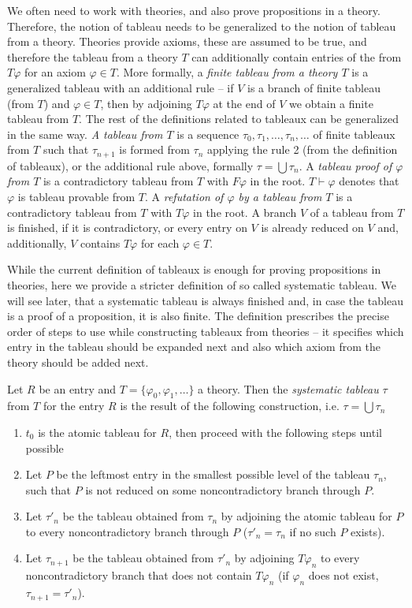 We often need to work with theories, and also prove propositions in a theory. Therefore, the notion of tableau needs to be generalized to the notion of tableau from a theory. Theories provide axioms, these are assumed to be true, and therefore the tableau from a theory $T$ can additionally contain entries of the from $T \varphi$ for an axiom $\varphi \in T$. More formally, a \emph{finite tableau from a theory $T$} is a generalized tableau with an additional rule -- if $V$ is a branch of finite tableau (from $T$) and $\varphi \in T$, then by adjoining $T \varphi$ at the end of $V$ we obtain a finite tableau from $T$. The rest of the definitions related to tableaux can be generalized in the same way. \emph{A tableau from $T$} is a sequence $\tau_0, \tau_1, \dots, \tau_n, \dots$ of finite tableaux from $T$ such that $\tau_{n+1}$ is formed from $\tau_n$ applying the rule 2 (from the definition of tableaux), or the additional rule above, formally $\tau = \bigcup \tau_n$. A \emph{tableau proof of $\varphi$ from $T$} is a contradictory tableau from $T$ with $F \varphi$ in the root. $T \vdash \varphi$ denotes that $\varphi$ is tableau provable from $T$. A \emph{refutation of $\varphi$ by a tableau from $T$} is a contradictory tableau from $T$ with $T \varphi$ in the root. A branch $V$ of a tableau from $T$ is finished, if it is contradictory, or every entry on $V$ is already reduced on $V$ and, additionally, $V$ contains $T \varphi$ for each $\varphi \in T$.

While the current definition of tableaux is enough for proving propositions in theories, here we provide a stricter definition of so called systematic tableau. We will see later, that a systematic tableau is always finished and, in case the tableau is a proof of a proposition, it is also finite. The definition prescribes the precise order of steps to use while constructing tableaux from theories -- it specifies which entry in the tableau should be expanded next and also which axiom from the theory should be added next.

\begin{definition}
Let $R$ be an entry and $T = \{\varphi_0, \varphi_1, \dots\}$ a theory. Then the \emph{systematic tableau} $\tau$ from $T$ for the entry $R$ is the result of the following construction, i.e. $\tau = \bigcup \tau_n$
\begin{enumerate}
	\item $t_0$ is the atomic tableau for $R$, then proceed with the following steps until possible
	\item Let $P$ be the leftmost entry in the smallest possible level of the tableau $\tau_n$, such that $P$ is not reduced on some noncontradictory branch through $P$.
	\item Let $\tau'_n$ be the tableau obtained from $\tau_n$ by adjoining the atomic tableau for $P$ to every noncontradictory branch through $P$ ($\tau'_n = \tau_n$ if no such $P$ exists).
	\item Let $\tau_{n+1}$ be the tableau obtained from $\tau'_n$ by adjoining $T \varphi_n$ to every noncontradictory branch that does not contain $T \varphi_n$ (if $\varphi_n$ does not exist, $\tau_{n+1}=\tau'_n$).
\end{enumerate}
\end{definition}

